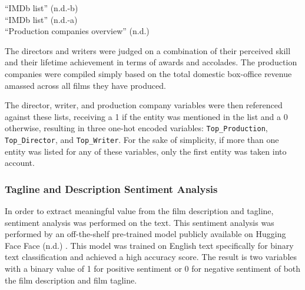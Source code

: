 \documentclass[
]{agujournal2019}
\begin{document}
{``IMDb list''} (n.d.-b)\\
{``IMDb list''} (n.d.-a)\\
{``Production companies overview''} (n.d.)

The directors and writers were judged on a combination of their
perceived skill and their lifetime achievement in terms of awards and
accolades. The production companies were compiled simply based on the
total domestic box-office revenue amassed across all films they have
produced.

The director, writer, and production company variables were then
referenced against these lists, receiving a 1 if the entity was
mentioned in the list and a 0 otherwise, resulting in three one-hot
encoded variables: \texttt{Top\_Production}, \texttt{Top\_Director}, and
\texttt{Top\_Writer}. For the sake of simplicity, if more than one
entity was listed for any of these variables, only the first entity was
taken into account.

\subsubsection{Tagline and Description Sentiment
Analysis}\label{tagline-and-description-sentiment-analysis}

In order to extract meaningful value from the film description and
tagline, sentiment analysis was performed on the text. This sentiment
analysis was performed by an off-the-shelf pre-trained model publicly
available on Hugging Face Face (n.d.) . This model was trained on
English text specifically for binary text classification and achieved a
high accuracy score. The result is two variables with a binary value of
1 for positive sentiment or 0 for negative sentiment of both the film
description and film tagline.
\end{document}
